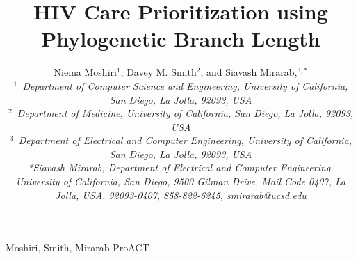\documentclass[oupdraft]{sysbio}
\begin{document}
\title{HIV Care Prioritization using Phylogenetic Branch Length}

\author{Niema Moshiri$^{1}$, Davey M. Smith$^{2}$, and
Siavash Mirarab,$^{3,\ast}$\\[4pt]
\textit{$^{1}$~Department of Computer Science and Engineering, University of California, San Diego, La Jolla, 92093, USA}
\\
\textit{$^{2}$~Department of Medicine, University of California, San Diego, La Jolla, 92093, USA}
\\
\textit{$^{3}$~Department of Electrical and Computer Engineering, University of California, San Diego, La Jolla, 92093, USA}
\\[2pt]
\textit{*Siavash Mirarab, Department of Electrical and Computer Engineering, University of California, San Diego, 9500 Gilman Drive, Mail Code 0407, La Jolla, USA, 92093-0407, 858-822-6245, smirarab@ucsd.edu}}

\markboth%
{Moshiri, Smith, Mirarab}
{ProACT}

\maketitle
\end{document}
